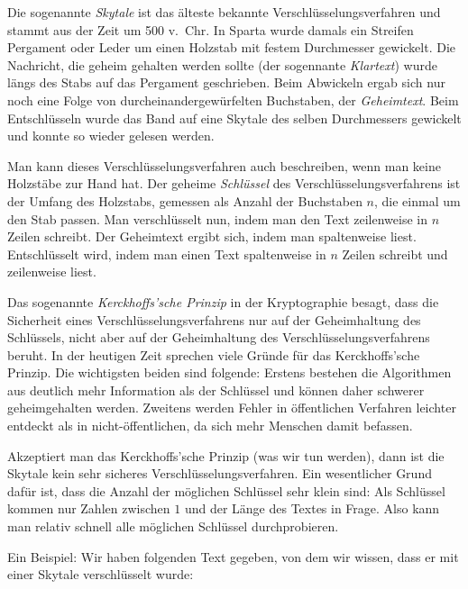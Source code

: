 \documentclass{zusammenfassung}
\begin{document}

Die sogenannte \emph{Skytale} ist das älteste bekannte Verschlüsselungsverfahren und stammt aus der Zeit um 500 v.~Chr. In Sparta
wurde damals ein Streifen Pergament oder Leder um einen Holzstab mit festem Durchmesser gewickelt. Die Nachricht, die geheim
gehalten werden sollte (der sogennante \emph{Klartext}) wurde längs des Stabs auf das Pergament geschrieben. Beim Abwickeln ergab
sich nur noch eine Folge von durcheinandergewürfelten Buchstaben, der \emph{Geheimtext}. Beim Entschlüsseln wurde das Band auf
eine Skytale des selben Durchmessers gewickelt und konnte so wieder gelesen werden.

Man kann dieses Verschlüsselungsverfahren auch beschreiben, wenn man keine Holzstäbe zur Hand hat. Der geheime \emph{Schlüssel}
des Verschlüsselungsverfahrens ist der Umfang des Holzstabs, gemessen als Anzahl der Buchstaben $n$, die einmal um den Stab
passen. Man verschlüsselt nun, indem man den Text zeilenweise in $n$ Zeilen schreibt. Der Geheimtext ergibt sich, indem man
spaltenweise liest. Entschlüsselt wird, indem man einen Text spaltenweise in $n$ Zeilen schreibt und zeilenweise liest.

Das sogenannte \emph{Kerckhoffs'sche Prinzip} in der Kryptographie besagt, dass die Sicherheit eines Verschlüsselungsverfahrens nur
auf der Geheimhaltung des Schlüssels, nicht aber auf der Geheimhaltung des Verschlüsselungsverfahrens beruht. In der heutigen Zeit
sprechen viele Gründe für das Kerckhoffs'sche Prinzip. Die wichtigsten beiden sind folgende:
Erstens bestehen die Algorithmen aus deutlich mehr Information als der
Schlüssel und können daher schwerer geheimgehalten werden. Zweitens werden Fehler in öffentlichen Verfahren leichter entdeckt als
in nicht-öffentlichen, da sich mehr Menschen damit befassen.

Akzeptiert man das Kerckhoffs'sche Prinzip (was wir tun werden), dann ist die Skytale kein sehr sicheres
Verschlüsselungsverfahren. Ein wesentlicher Grund dafür ist, dass die Anzahl der möglichen Schlüssel sehr klein sind: Als
Schlüssel kommen nur Zahlen zwischen $1$ und der Länge des Textes in Frage. Also kann man relativ schnell alle möglichen Schlüssel
durchprobieren.

Ein Beispiel: Wir haben folgenden Text gegeben, von dem wir wissen, dass er mit einer Skytale verschlüsselt wurde:
\end{document}
